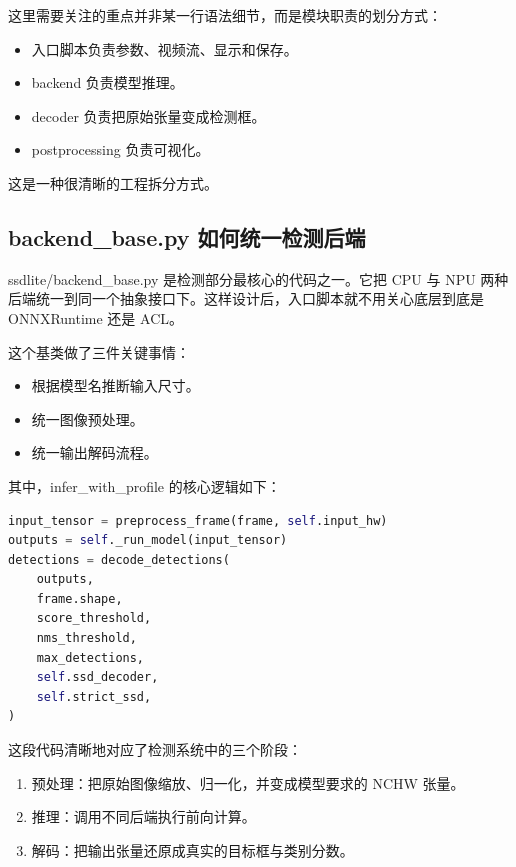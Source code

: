 这里需要关注的重点并非某一行语法细节，而是模块职责的划分方式：

\begin{itemize}
\tightlist
\item
  入口脚本负责参数、视频流、显示和保存。
\item
  backend 负责模型推理。
\item
  decoder 负责把原始张量变成检测框。
\item
  postprocessing 负责可视化。
\end{itemize}

这是一种很清晰的工程拆分方式。

\subsection{backend\_base.py
如何统一检测后端}\label{src-experiment-case2-h26}

ssdlite/backend\_base.py 是检测部分最核心的代码之一。它把 CPU 与 NPU
两种后端统一到同一个抽象接口下。这样设计后，入口脚本就不用关心底层到底是
ONNXRuntime 还是 ACL。

这个基类做了三件关键事情：

\begin{itemize}
\tightlist
\item
  根据模型名推断输入尺寸。
\item
  统一图像预处理。
\item
  统一输出解码流程。
\end{itemize}

其中，infer\_with\_profile 的核心逻辑如下：

\begin{lstlisting}[language=Python]
input_tensor = preprocess_frame(frame, self.input_hw)
outputs = self._run_model(input_tensor)
detections = decode_detections(
    outputs,
    frame.shape,
    score_threshold,
    nms_threshold,
    max_detections,
    self.ssd_decoder,
    self.strict_ssd,
)
\end{lstlisting}

这段代码清晰地对应了检测系统中的三个阶段：

\begin{enumerate}
\def\labelenumi{\arabic{enumi}.}
\tightlist
\item
  预处理：把原始图像缩放、归一化，并变成模型要求的 NCHW 张量。
\item
  推理：调用不同后端执行前向计算。
\item
  解码：把输出张量还原成真实的目标框与类别分数。
\end{enumerate}

